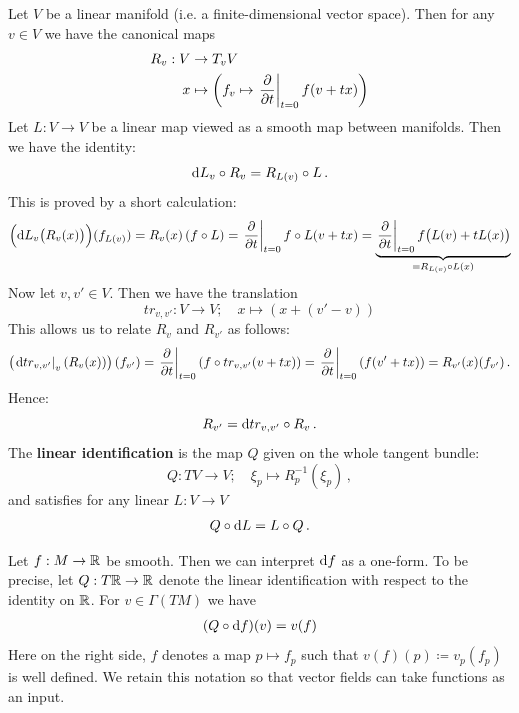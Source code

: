 	
	\begin{definition}\label{def:vb-linearIdentification}
	Let $V$ be a linear manifold (i.e. a finite-dimensional vector space). Then for any $v\in V$ we have the canonical maps
	\begin{align*}
		R_v:V&\to T_vV\,\\
		x&\mapsto \left(f_v\mapsto \left.\frac{\partial }{\partial t}\right|_{t=0}f(v+tx)\right)
	\end{align*}
	Let $L:V\to V$ be a linear map viewed as a smooth map between manifolds. Then we have the identity:
	\begin{equation*}
		{\mathop{}\!\mathrm{d}L}_{v} \circ R_v =R_{L(v)}\circ L\,.
	\end{equation*} This is proved by a short calculation:
	\begin{equation*}
		\Big({\mathop{}\!\mathrm{d} L}_{v} \big( R_v(x)\big)\Big)(f_{L(v)})=R_{v}(x)\left(f\circ L\right)=\left.\frac{\partial }{\partial t}\right|_{t=0}f\circ L(v+tx)=\underbrace{\left.\frac{\partial }{\partial t}\right|_{t=0}f\big( L(v)+tL(x)\big)}_{=R_{L(v)}\circ L(x)}
	\end{equation*} Now let $v,v'\in V$. Then we have the translation
	\begin{equation*}
		tr_{v,v'}: V\to V;\quad x\mapsto (x+(v'-v))
	\end{equation*} This allows us to relate $R_v$ and $R_{v'}$ as follows:
	\begin{equation*}
		\left(\left.\mathop{}\!\mathrm{d} tr_{v,v'}\right|_{v}(R_v(x))\right)(f_{v'})=\left.\frac{\partial }{\partial t}\right|_{t=0}\left(f\circ tr_{v,v'}(v+tx)\right)=\left.\frac{\partial }{\partial t}\right|_{t=0}\left(f(v'+tx)\right)=R_{v'}(x)(f_{v'}) \,.
	\end{equation*} Hence:
	\begin{equation*}
		R_{v'}=\mathop{}\!\mathrm{d} tr_{v,v'}\circ R_v\,.
	\end{equation*} 
	The \textbf{linear identification } is the map $Q$ given on the whole tangent bundle:
	\begin{equation*}
		Q:TV\to V;\quad \xi_p \mapsto R_p^{-1}(\xi_p)\,,
	\end{equation*} and satisfies for any linear $L : V\to V$ 
	\begin{equation*}
		Q\circ \mathop{}\!\mathrm{d} L=L\circ Q\,.
	\end{equation*}
\end{definition}

	\begin{corollary}\label{cor:vb-vectorFieldsTakeFunctions}
		Let $f:M\to \mathbb{R}$ be smooth. Then we can interpret $\mathop{}\!\mathrm{d} f$ as a one-form. To be precise, let $Q : T\mathbb{R}\to \mathbb{R}$ denote the linear identification with respect to the identity on $\mathbb{R}$. For $v\in \Gamma( TM)$ we have
		\begin{align*}
			(Q\circ \mathop{}\!\mathrm{d} f)(v)=v(f)
		\end{align*} Here on the right side, $f$ denotes a map $p\mapsto f_p$ such that $v(f)(p)\coloneq v_p(f_p)$ is well defined. We retain this notation so that vector fields can take functions as an input.
	\end{corollary}

